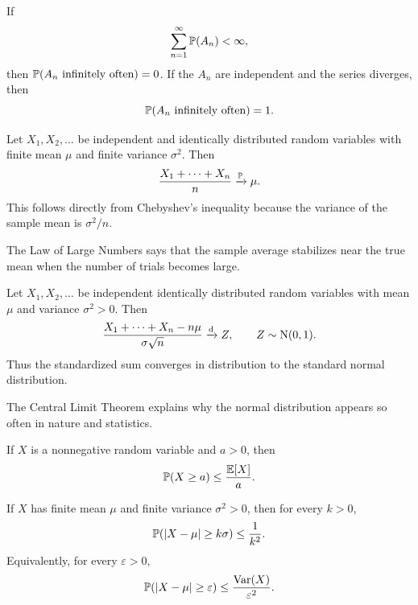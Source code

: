     \begin{theorem}
        If
        \[
            \sum_{n=1}^{\infty}\mathbb{P}(A_n)<\infty,
        \]
        then $\mathbb{P}(A_n\text{ infinitely often})=0$. If the $A_n$ are
        independent and the series diverges, then
        \[
            \mathbb{P}(A_n\text{ infinitely often})=1.
        \]
    \end{theorem}

    \begin{theorem}
        Let $X_1,X_2,\dots$ be independent and identically distributed random
        variables with finite mean $\mu$ and finite variance $\sigma^2$. Then
        \[
            \frac{X_1+\cdots+X_n}{n}
            \xrightarrow{\mathbb{P}}
            \mu.
        \]
        This follows directly from Chebyshev's inequality because the variance
        of the sample mean is $\sigma^2/n$.
    \end{theorem}

    \begin{idea}
        The Law of Large Numbers says that the sample average stabilizes near
        the true mean when the number of trials becomes large.
    \end{idea}

    \begin{theorem}
        Let $X_1,X_2,\dots$ be independent identically distributed random
        variables with mean $\mu$ and variance $\sigma^2>0$. Then
        \[
            \frac{X_1+\cdots+X_n-n\mu}{\sigma\sqrt n}
            \xrightarrow{\mathrm{d}}
            Z,
            \qquad
            Z\sim\operatorname{N}(0,1).
        \]
        Thus the standardized sum converges in distribution to the standard
        normal distribution.
    \end{theorem}

    \begin{remark}
        The Central Limit Theorem explains why the normal distribution appears
        so often in nature and statistics.
    \end{remark}

    \begin{theorem}
        If $X$ is a nonnegative random variable and $a>0$, then
        \[
            \mathbb{P}(X\geq a)
            \leq
            \frac{\mathbb{E}[X]}{a}.
        \]
    \end{theorem}

    \begin{theorem}
        If $X$ has finite mean $\mu$ and finite variance $\sigma^2>0$, then
        for every $k>0$,
        \[
            \mathbb{P}(|X-\mu|\geq k\sigma)
            \leq
            \frac{1}{k^2}.
        \]
        Equivalently, for every $\varepsilon>0$,
        \[
            \mathbb{P}(|X-\mu|\geq \varepsilon)
            \leq
            \frac{\operatorname{Var}(X)}{\varepsilon^2}.
        \]
    \end{theorem}

